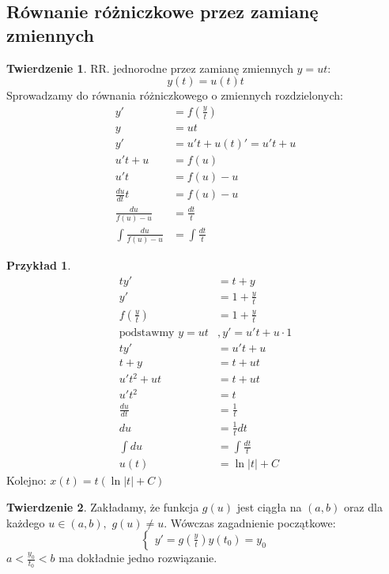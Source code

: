 \documentclass{article}
\theoremstyle{definition}
\theoremstyle{definition}
\newtheorem{tw}{Twierdzenie}[subsection]
\theoremstyle{definition}
\newtheorem{pk}{Przykład}[subsection]
\theoremstyle{definition}
\begin{document}
\subsection{Równanie różniczkowe przez zamianę zmiennych}

\begin{tw}
    RR. jednorodne przez zamianę zmiennych $y=ut$:
    \[y(t)=u(t)t\]
    Sprowadzamy do równania różniczkowego o zmiennych rozdzielonych:
    \begin{align}
        y'&=f\left(\frac{y}{t}\right)\\
        y&=ut\\
        y'&=u't+u(t)' =u't+u\\
        u't+u &= f(u)\\
        u't &= f(u)-u\\
        \frac{du}{dt}t &= f(u)-u\\
        \frac{du}{f(u)-u} &= \frac{dt}{t}\\
        \int \frac{du}{f(u)-u} &= \int \frac{dt}{t}
    \end{align}
\end{tw}

\begin{pk}
    \begin{align}
        ty' &= t + y\\
        y'&=1+\frac{y}{t}\\
        f(\frac{y}{t}) &= 1 + \frac{y}{t}\\
        \text {podstawmy } y=ut&, y'=u't + u \cdot 1\\
        ty' &= u't + u\\
        t+y &= t+ut\\
        u't^2 + ut &= t + ut\\
        u't^2 &= t\\
        \frac{du}{dt} &= \frac{1}{t}\\
        du &= \frac{1}{t} dt\\
        \int du &= \int \frac{dt}{t}\\
        u(t) &= \ln|t| + C
    \end{align}
    Kolejno: $x(t)=t\left(\ln|t|+C\right)$
\end{pk}

\begin{tw}
    Zakładamy, że funkcja $g(u)$ jest ciągła na $(a,b)$ 
    oraz dla każdego $u\in(a,b),$ $g(u)\neq u$.
    Wówczas zagadnienie początkowe:
    $$
    \begin{cases}
        y' = g\left(\frac{y}{t}\right)
        y(t_0)=y_0
    \end{cases}
    $$
    $a < \frac{y_0}{t_0} < b$ ma dokładnie jedno rozwiązanie.
\end{tw}
\end{document}
